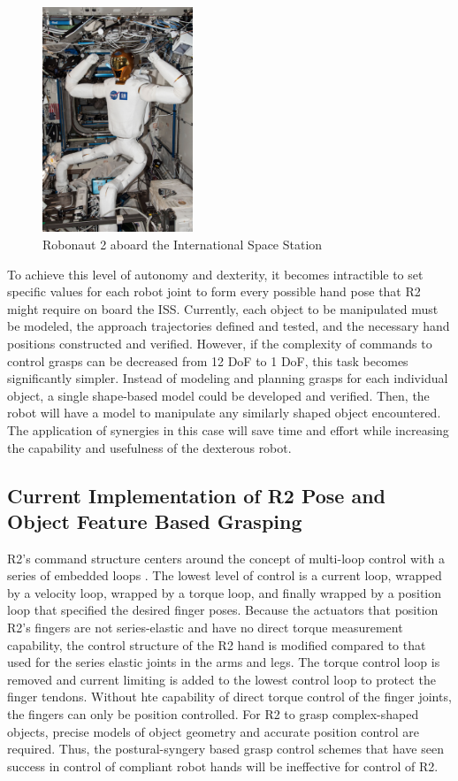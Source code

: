 \documentclass[runningheads,a4paper]{llncs}
\begin{document}
   \begin{figure}[t]
      \centering
      \includegraphics[width=0.4\textwidth]{r2_iss}
      \caption{Robonaut 2 aboard the International Space Station}
      \label{at_r2_iss}
   \end{figure}

To achieve this level of autonomy and dexterity, it becomes intractible to set specific values for each robot joint to form every possible hand pose that R2 might require on board the ISS. Currently, each object to be manipulated must be modeled, the approach trajectories defined and tested, and the necessary hand positions constructed and verified. However, if the complexity of commands to control grasps can be decreased from 12 DoF to 1 DoF, this task becomes significantly simpler. Instead of modeling and planning grasps for each individual object, a single shape-based model could be developed and verified. Then, the robot will have a model to manipulate any similarly shaped object encountered. The application of synergies in this case will save time and effort while increasing the capability and usefulness of the dexterous robot.   


\subsection{Current Implementation of R2 Pose and Object Feature Based Grasping}
R2's command structure centers around the concept of multi-loop control with a series of embedded loops \cite{r2_control}. The lowest level of control is a current loop, wrapped by a velocity loop, wrapped by a torque loop, and finally wrapped by a position loop that specified the desired finger poses. 
Because the actuators that position R2's fingers are not series-elastic and have no direct torque measurement capability, the control structure of the R2 hand is modified compared to that used for the series elastic joints in the arms and legs. The torque control loop is removed and current limiting is added to the lowest control loop to protect the finger tendons. Without hte capability of direct torque control of the finger joints, the fingers can only be position controlled. For R2 to grasp complex-shaped objects, precise models of object geometry and accurate position control are required. Thus, the postural-syngery based grasp control schemes that have seen success in control of compliant robot hands \cite{} will be ineffective for control of R2. 
\end{document}

